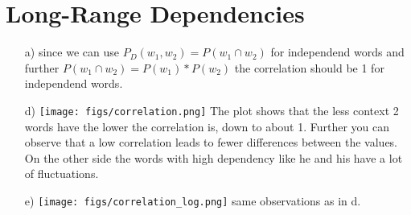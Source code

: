 \documentclass{article}
\begin{document}
\section{Long-Range Dependencies}
\begin{itemize}
    \item[a)]
    since we can use $P_{D}(w_1,w_2)= P(w_1\cap w_2)$ for independend words and further $P(w_1\cap w_2) = P(w_1)*P(w_2)$ the correlation should be 1 for independend words.
    \item[d)]
    \texttt{[image: figs/correlation.png]}
    The plot shows that the less context 2 words have the lower the correlation is, down to about 1. Further you can observe that a low correlation leads to fewer differences between the values. On the other side the words with high dependency like he and his have a lot of fluctuations.
    \item[e)]
    \texttt{[image: figs/correlation\_log.png]}
    same observations as in d.

\end{itemize}
\end{document}
